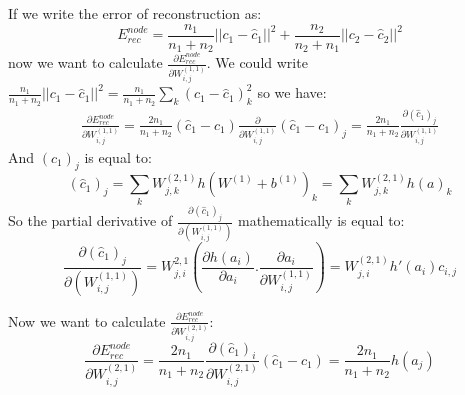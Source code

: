\documentclass[twoside,12pt]{article}
\begin{document}
If we write the error of reconstruction as:
\begin{equation}
E^{node}_{rec}=\frac{n_1}{n_1+n_2}||c_1-\hat{c}_1||^2+\frac{n_2}{n_2+n_1}||c_2-\hat{c}_2||^2
\end{equation}
now we want to calculate $\frac{\partial E^{node}_{rec}}{\partial W^{(1,1)}_{i,j}}$. We could write $\frac{n_1}{n_1+n_2}||c_1-\hat{c}_1||^2=\frac{n_1}{n_1+n_2}\sum_k{(c_1-\hat{c}_1)^2_k}$ so we have:
\begin{align}
\frac{\partial E^{node}_{rec}}{\partial W^{(1,1)}_{i,j}}=\frac{2n_1}{n_1+n_2}(\hat{c}_1-c_1)\frac{\partial}{\partial W^{(1,1)}_{i,j}}(\hat{c}_1-c_1)_{j}=\frac{2n_1}{n_1+n_2}\frac{\partial (\hat{c}_1)_j}{\partial W^{(1,1)}_{i,j}}
\end{align}
And $(\hat{c}_1)_j$ is equal to:
\begin{equation}
(\hat{c}_1)_j=\sum_{k}W^{(2,1)}_{j,k}h(W^{(1)}+b^{(1)})_k=\sum_kW^{(2,1)}_{j,k}h(a)_k
\end{equation}
So the partial derivative of $\frac{\partial (\hat{c}_1)_j}{\partial (W^{(1,1)}_{i,j})}$ mathematically is equal to:
\begin{equation}
\frac{\partial (\hat{c}_1)_j}{\partial (W^{(1,1)}_{i,j})}= W^{2,1}_{j,i}(\frac{\partial h(a_i)}{\partial a_i}.\frac{\partial a_i}{\partial W^{(1,1)}_{i,j}})=W^{(2,1)}_{j,i}h'(a_i)c_{i,j}
\end{equation}

Now we want to calculate $\frac{\partial E^{node}_{rec}}{\partial W^{(2,1)}_{i,j}}$:
\begin{equation}
\frac{\partial E^{node}_{rec}}{\partial W^{(2,1)}_{i,j}}=\frac{2n_1}{n_1+n_2}\frac{\partial (\hat{c}_1)_i}{\partial W^{(2,1)}_{i,j}}(\hat{c}_1-c_1)=\frac{2n_1}{n_1+n_2}h(a_j)
\end{equation}
\end{document}
